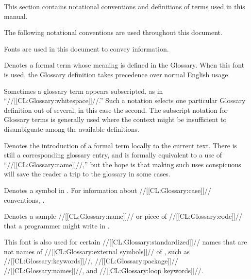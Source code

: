 


This section contains notational conventions and definitions of terms
used in this manual.


The following notational conventions are used throughout this document.



Fonts are used in this document to convey information.

\beginlist


Denotes a formal term whose meaning is defined in the Glossary.
When this font is used, the Glossary definition takes precedence 
over normal English usage.

Sometimes a glossary term appears subscripted, 
as in ``//[[CL:Glossary:whitespace]]//.''  
Such a notation selects one particular Glossary definition out of several,
in this case the second.
The subscript notation for Glossary terms is generally used where the
context might be insufficient to disambiguate among the available definitions.


Denotes the introduction of a formal term locally to the current text.
There is still a corresponding glossary entry, and is formally equivalent
to a use of ``//[[CL:Glossary:name]]//,'' but the hope is that making such uses 
conspicuous will save the reader a trip to the glossary in some cases.

                           
Denotes a symbol in .
For information about //[[CL:Glossary:case]]// conventions,
\seesection\CaseInSymbols.


Denotes a sample //[[CL:Glossary:name]]// or piece of //[[CL:Glossary:code]]// that a programmer
might write in \clisp.

This font is also used for certain //[[CL:Glossary:standardized]]// names that are not
names of //[[CL:Glossary:external symbols]]// of , 
such as //[[CL:Glossary:keywords]]//,
        //[[CL:Glossary:package]]// //[[CL:Glossary:names]]//,
    and //[[CL:Glossary:loop keywords]]//.



